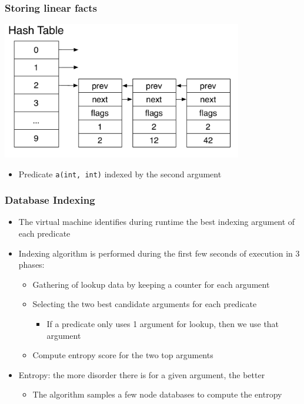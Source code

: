 \documentclass{beamer}
\begin{document}
\begin{frame}[fragile]
   \frametitle{Storing linear facts}
   \begin{center}
      \includegraphics[height=6cm]{hash_table.pdf}
   \end{center}
   \begin{itemize}
      \item {\large Predicate \texttt{a(int, int)} indexed by the second argument}
   \end{itemize}
\end{frame}

\begin{frame}[fragile]
   \frametitle{Database Indexing}
   \begin{itemize}
      \item The virtual machine identifies during runtime the best indexing argument of each predicate
      \item Indexing algorithm is performed during the first few seconds of execution in 3 phases:
      \begin{itemize}
         \item Gathering of lookup data by keeping a counter for each argument
         \item Selecting the two best candidate arguments for each predicate
         \begin{itemize}
            \item If a predicate only uses 1 argument for lookup, then we use that argument
         \end{itemize}
         \item Compute entropy score for the two top arguments
      \end{itemize}
      \item Entropy: the more disorder there is for a given argument, the better
      \begin{itemize}
         \item The algorithm samples a few node databases to compute the entropy
      \end{itemize}
   \end{itemize}
\end{frame}
\end{document}
